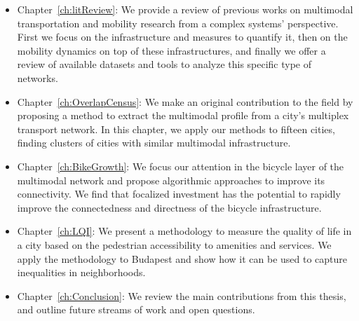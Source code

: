 \begin{itemize}
    \item Chapter~\ref{ch:litReview}: We provide a review of previous works on multimodal transportation and mobility research from a complex systems' perspective. First we focus on the infrastructure and measures to quantify it, then on the mobility dynamics on top of these infrastructures, and finally we offer a review of available datasets and tools to analyze this specific type of networks.
    \item Chapter~\ref{ch:OverlapCensus}: We make an original contribution to the field by proposing a method to extract the multimodal profile from a city's multiplex transport network. In this chapter, we apply our methods to fifteen cities, finding clusters of cities with similar multimodal infrastructure.
    \item Chapter~\ref{ch:BikeGrowth}: We focus our attention in the bicycle layer of the multimodal network and propose algorithmic approaches to improve its connectivity. We find that focalized investment has the potential to rapidly improve the connectedness and directness of the bicycle infrastructure.
    \item Chapter~\ref{ch:LQI}: We present a methodology to measure the quality of life in a city based on the pedestrian accessibility to amenities and services. We apply the methodology to Budapest and show how it can be used to capture inequalities in neighborhoods. 
    \item Chapter~\ref{ch:Conclusion}: We review the main contributions from this thesis, and outline future streams of work and open questions. 
\end{itemize}






